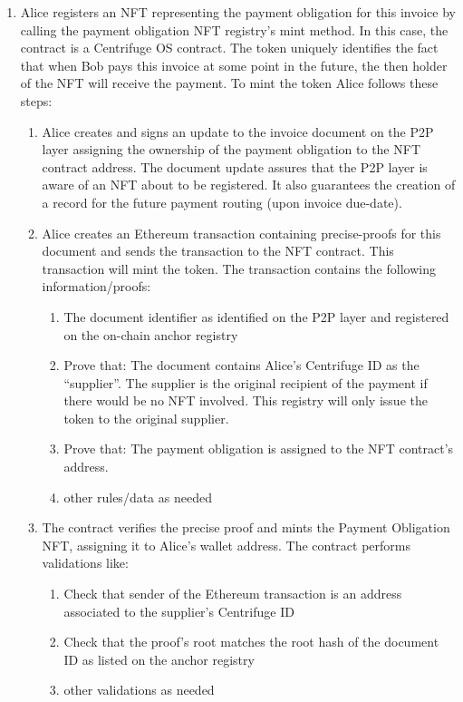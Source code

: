 \documentclass[a4paper, 10pt]{article}
\begin{document}
\begin{enumerate}
    \item Alice registers an NFT representing the payment obligation for this invoice by calling the payment obligation NFT registry’s mint method. In this case, the contract is a Centrifuge OS contract. The token uniquely identifies the fact that when Bob pays this invoice at some point in the future, the then holder of the NFT will receive the payment. To mint the token Alice follows these steps:
    \begin{enumerate}
        \item Alice creates and signs an update to the invoice document on the P2P layer assigning the ownership of the payment obligation to the NFT contract address. The document update assures that the P2P layer is aware of an NFT about to be registered. It also guarantees the creation of a record for the future payment routing (upon invoice due-date).
        \item Alice creates an Ethereum transaction containing precise-proofs for this document and sends the transaction to the NFT contract. This transaction will mint the token. The transaction contains the following information/proofs:
        \begin{enumerate}
            \item The document identifier as identified on the P2P layer and registered on the on-chain anchor registry
            \item Prove that: The document contains Alice’s Centrifuge ID as the “supplier”. The supplier is the original recipient of the payment if there would be no NFT involved. This registry will only issue the token to the original supplier.
            \item Prove that: The payment obligation is assigned to the NFT contract’s address.
            \item other rules/data as needed
        \end{enumerate}
        \item The contract verifies the precise proof and mints the Payment Obligation NFT, assigning it to Alice’s wallet address. The contract performs validations like:
        \begin{enumerate} 
            \item Check that sender of the Ethereum transaction is an address associated to the supplier’s Centrifuge ID
            \item Check that the proof’s root matches the root hash of the document ID as listed on the anchor registry
            \item other validations as needed

\end{enumerate}
\end{enumerate}
\end{enumerate}
\end{document}
